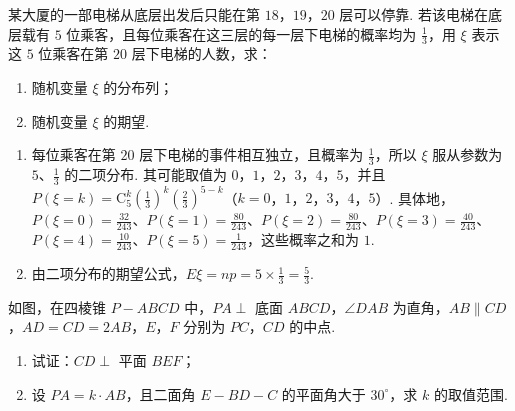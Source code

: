 \begin{problem}
某大厦的一部电梯从底层出发后只能在第 \(18\)，\(19\)，\(20\) 层可以停靠. 若该电梯在底层载有 \(5\) 位乘客，且每位乘客在这三层的每一层下电梯的概率均为 \(\frac{1}{3}\)，用 \(\xi\) 表示这 \(5\) 位乘客在第 \(20\) 层下电梯的人数，求：
\begin{enumerate}
\item 随机变量 \(\xi\) 的分布列；
\item 随机变量 \(\xi\) 的期望.
\end{enumerate}
\end{problem}

\begin{solution}
\begin{enumerate}
\item 每位乘客在第 \(20\) 层下电梯的事件相互独立，且概率为 \(\frac13\)，所以 \(\xi\) 服从参数为 \(5\)、\(\frac13\) 的二项分布. 其可能取值为 \(0\)，\(1\)，\(2\)，\(3\)，\(4\)，\(5\)，并且 \(P(\xi=k)=\mathrm C_{5}^{k}\left(\frac13\right)^{k}\left(\frac23\right)^{5-k}\)（\(k=0\)，\(1\)，\(2\)，\(3\)，\(4\)，\(5\)）. 具体地，\(P(\xi=0)=\frac{32}{243}\)、\(P(\xi=1)=\frac{80}{243}\)、\(P(\xi=2)=\frac{80}{243}\)、\(P(\xi=3)=\frac{40}{243}\)、\(P(\xi=4)=\frac{10}{243}\)、\(P(\xi=5)=\frac{1}{243}\)，这些概率之和为 \(1\).
\item 由二项分布的期望公式，\(E\xi=np=5\times\frac13=\frac53\).
\end{enumerate}
\end{solution}

\begin{problem}
如图，在四棱锥 \(P - ABCD\) 中，\(PA \perp\) 底面 \(ABCD\)，\(\angle DAB\) 为直角，\(AB \parallel CD\)，\(AD = CD = 2AB\)，\(E\)，\(F\) 分别为 \(PC\)，\(CD\) 的中点.

\begin{enumerate}
\item 试证：\(CD \perp\) 平面 \(BEF\)；
\item 设 \(PA = k \cdot AB\)，且二面角 \(E - BD - C\) 的平面角大于 \(30^{\circ}\)，求 \(k\) 的取值范围.
\end{enumerate}

\end{problem}

